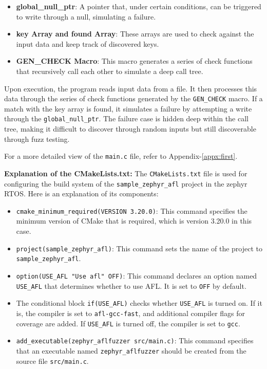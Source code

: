 \begin{itemize}
\item \textbf{global\_null\_ptr}: A pointer that, under certain conditions,
can be triggered to write through a null, simulating a failure.
\item \textbf{key Array and found Array}: These arrays are used to check against
the input data and keep track of discovered keys.
\item \textbf{GEN\_CHECK Macro}: This macro generates a series of check
functions that recursively call each other to simulate a deep call tree.
\end{itemize}

Upon execution, the program reads input data from a file. It then processes
this data through the series of check functions generated by
the \texttt{GEN\_CHECK} macro. If a match with the key array is found,
it simulates a failure by attempting a write through the \texttt{global\_null\_ptr}.
The failure case is hidden deep within the call tree, making it difficult to
discover through random inputs but still discoverable through fuzz testing.

For a more detailed view of the \texttt{main.c} file, refer to
Appendix-\ref{appx:first}.

\textbf{Explanation of the CMakeLists.txt:}
The \texttt{CMakeLists.txt} file is used for configuring the build system
of the \texttt{sample\_zephyr\_afl} project in the zephyr RTOS. Here is an
explanation of its components:

\begin{itemize}
    \item \texttt{cmake\_minimum\_required(VERSION 3.20.0)}: This command
    specifies the minimum version of CMake that is required, which is version
    3.20.0 in this case.
    \item \texttt{project(sample\_zephyr\_afl)}: This command sets the name
    of the project to \texttt{sample\_zephyr\_afl}.
    \item \texttt{option(USE\_AFL "Use afl" OFF)}: This command declares an
    option named \texttt{USE\_AFL} that determines whether to use AFL. It is
    set to \texttt{OFF} by default.
    \item The conditional block \texttt{if(USE\_AFL)} checks
    whether \texttt{USE\_AFL} is turned on. If it is, the compiler is
    set to \texttt{afl-gcc-fast}\cite{AFLplusp13:online}, and additional
    compiler flags for coverage are added. If \texttt{USE\_AFL} is turned off,
    the compiler is set to \texttt{gcc}\cite{GCCtheGN9:online}.
    \item \texttt{add\_executable(zephyr\_aflfuzzer src/main.c)}: This
    command specifies that an executable named \texttt{zephyr\_aflfuzzer}
    should be created from the source file \texttt{src/main.c}.
\end{itemize}

